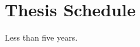 \documentclass[ms]{byuprop}
\begin{document}





\section{Thesis Schedule}

Less than five years.





\end{document}
